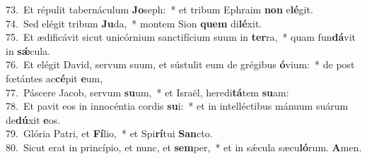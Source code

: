{73.~}Et répulit tabernáculum \textbf{Jo}seph:~* et tribum Ephraim \textbf{non} e\textbf{lé}git.\\
{74.~}Sed elégit tribum \textbf{Ju}da,~* montem Sion \textbf{quem} di\textbf{lé}xit.\\
{75.~}Et ædificávit sicut unicórnium sanctifícium suum in \textbf{ter}ra,~* quam fun\textbf{dá}vit in \textbf{sǽ}cula.\\
{76.~}Et elégit David, servum suum, et sústulit eum de grégibus \textbf{ó}vium:~* de post fœtántes ac\textbf{cé}pit \textbf{e}um,\\
{77.~}Páscere Jacob, servum \textbf{su}um,~* et Israël, heredi\textbf{tá}tem \textbf{su}am:\\
{78.~}Et pavit eos in innocéntia cordis \textbf{su}i:~* et in intelléctibus mánuum suárum de\textbf{dú}xit \textbf{e}os.\\
{79.~}Glória Patri, et \textbf{Fí}lio,~* et Spi\textbf{rí}tui \textbf{San}cto.\\
{80.~}Sicut erat in princípio, et nunc, et \textbf{sem}per,~* et in sǽcula sæcu\textbf{ló}rum. \textbf{A}men.\\
